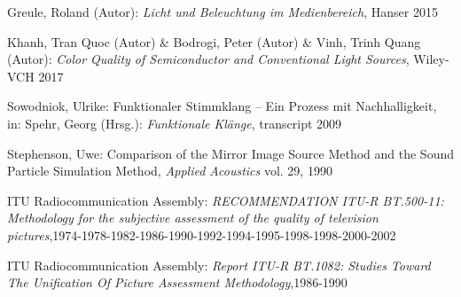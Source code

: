 \begin{thebibliography}{}
Greule, Roland (Autor):
\emph{Licht und Beleuchtung im Medienbereich}, Hanser 2015 

Khanh, Tran Quoc (Autor) \& Bodrogi, Peter (Autor) \& Vinh, Trinh Quang (Autor):
\emph{Color Quality of Semiconductor and Conventional Light Sources}, Wiley-VCH 2017


Sowodniok, Ulrike: 
\glqq Funktionaler Stimmklang -- Ein Prozess mit Nachhalligkeit\grqq, 
in: Spehr, Georg (Hrsg.): \emph{Funktionale Klänge}, transcript 2009




Stephenson, Uwe: 
\glqq Comparison of the Mirror Image Source Method and the Sound Particle Simulation Method\grqq, 
\emph{Applied Acoustics} vol. 29, 1990

ITU Radiocommunication Assembly:
\emph{RECOMMENDATION ITU-R BT.500-11: Methodology for the subjective assessment of the quality of television pictures},1974-1978-1982-1986-1990-1992-1994-1995-1998-1998-2000-2002

ITU Radiocommunication Assembly:
\emph{Report ITU-R BT.1082: Studies Toward The Unification Of Picture Assessment Methodology},1986-1990

\end{thebibliography}

\clearpage\thispagestyle{empty}
\eigen  %












